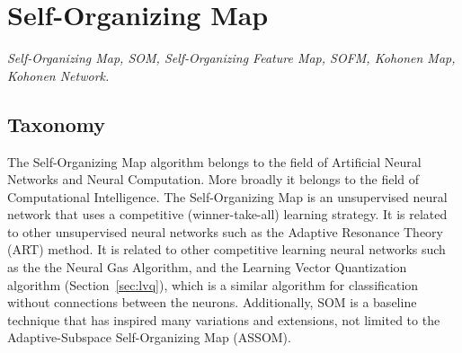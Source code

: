 

\section{Self-Organizing Map} 
\label{sec:som}

\emph{Self-Organizing Map, SOM, Self-Organizing Feature Map, SOFM, Kohonen Map, Kohonen Network.}

\subsection{Taxonomy}
The Self-Organizing Map algorithm belongs to the field of Artificial Neural Networks and Neural Computation. More broadly it belongs to the field of Computational Intelligence.  
The Self-Organizing Map is an unsupervised neural network that uses a competitive (winner-take-all) learning strategy.
It is related to other unsupervised neural networks such as the Adaptive Resonance Theory (ART) method.
It is related to other competitive learning neural networks such as the the Neural Gas Algorithm, and the Learning Vector Quantization algorithm (Section~\ref{sec:lvq}), which is a similar algorithm for classification without connections between the neurons. 
Additionally, SOM is a baseline technique that has inspired many variations and extensions, not limited to the Adaptive-Subspace Self-Organizing Map (ASSOM).

